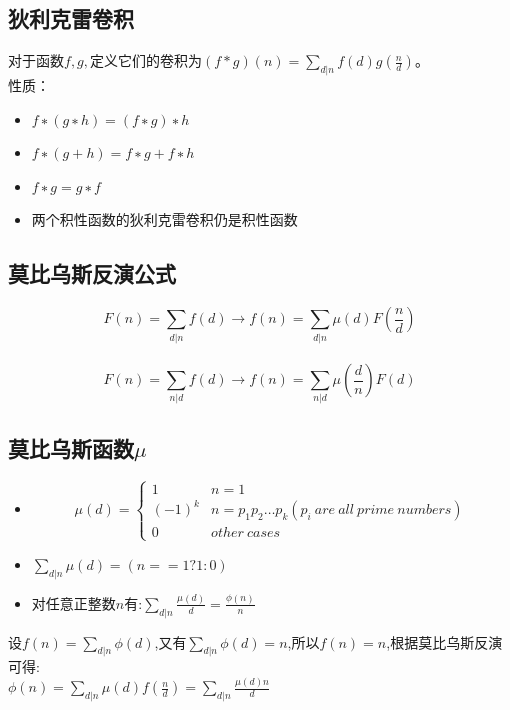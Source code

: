 \subsection{狄利克雷卷积}
对于函数$f,g,$定义它们的卷积为$(f*g)(n)=\sum_{d|n}f(d)g(\frac{n}{d})$。 \\
性质： \\
\begin{itemize}
\item $f∗(g∗h)=(f∗g)∗h$
\item $f∗(g+h)=f∗g+f∗h$
\item $f∗g=g∗f$
\item 两个积性函数的狄利克雷卷积仍是积性函数
\end{itemize}

\subsection{莫比乌斯反演公式}
$$F(n) =\sum_{d|n}f(d) \rightarrow f(n)=\sum_{d|n} \mu(d)F(\frac{n}{d}) $$ \\
$$F(n)=\sum_{n|d}f(d) \rightarrow f(n) =\sum_{n|d} \mu (\frac{d}{n})F(d)$$

\subsection{莫比乌斯函数$\mu$}
\begin{itemize}
\item \[ \mu(d)=
\begin{cases}{}
1  &  {n = 1}\\
(-1)^{k}&  n = p_1p_2\dots p_{k}(p_i\ are\ all\ prime\ numbers)\\
0 &  other\  cases
\end{cases}
\]
\item $\sum_{d|n}{}\mu(d) = (n == 1 ? 1 : 0)$ \\
\item 对任意正整数$n$有:$\sum_{d|n}\frac{\mu(d)}{d} = \frac{\phi(n)}{n}$ \\
\end{itemize}

设$f(n) = \sum_{d|n}\phi(d)$,又有$\sum_{d|n}\phi(d) = n$,所以$f(n) = n$,根据莫比乌斯反演可得:\\
$\phi(n)= \sum_{d|n}\mu(d)f(\frac{n}{d}) = \sum_{d|n}\frac{\mu(d)n}{d}$ \\

